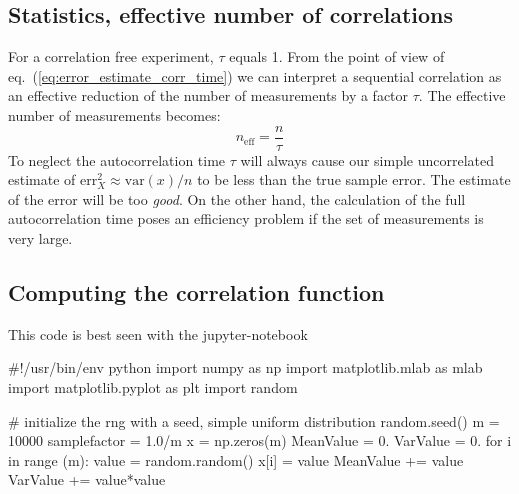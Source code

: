 \documentclass[%
oneside,                 %
final,                   %
10pt]{article}
\begin{document}
\subsection{Statistics, effective number of correlations}
\begin{block}{}
For a correlation free experiment, $\tau$
equals 1. From the point of view of
eq.~(\ref{eq:error_estimate_corr_time}) we can interpret a sequential
correlation as an effective reduction of the number of measurements by
a factor $\tau$. The effective number of measurements becomes:
\[
n_\mathrm{eff} = \frac{n}{\tau}
\]
To neglect the autocorrelation time $\tau$ will always cause our
simple uncorrelated estimate of $\mathrm{err}_X^2\approx \mathrm{var}(x)/n$ to
be less than the true sample error. The estimate of the error will be
too \emph{good}. On the other hand, the calculation of the full
autocorrelation time poses an efficiency problem if the set of
measurements is very large.
\end{block}

\subsection{Computing the correlation function}

This code is best seen with the jupyter-notebook












































\bpycod
#!/usr/bin/env python
import numpy as np
import matplotlib.mlab as mlab
import matplotlib.pyplot as plt
import random

# initialize the rng with a seed, simple uniform distribution
random.seed() 
m = 10000
samplefactor = 1.0/m
x = np.zeros(m)   
MeanValue = 0.
VarValue = 0.
for i in range (m):
    value = random.random()
    x[i] = value
    MeanValue += value
    VarValue += value*value
\end{document}
